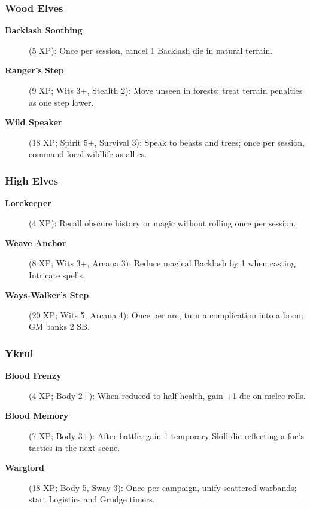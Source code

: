 \subsubsection{Wood Elves}\label{subsubsec:wood_elf_talents}

\begin{description}
    \item[\textbf{Backlash Soothing}] (5 XP): Once per session, cancel 1 Backlash die in natural terrain.
    \item[\textbf{Ranger's Step}] (9 XP; Wits 3+, Stealth 2): Move unseen in forests; treat terrain penalties as one step lower.
    \item[\textbf{Wild Speaker}] (18 XP; Spirit 5+, Survival 3): Speak to beasts and trees; once per session, command local wildlife as allies.
\end{description}

\subsubsection{High Elves}\label{subsubsec:high_elf_talents}

\begin{description}
    \item[\textbf{Lorekeeper}] (4 XP): Recall obscure history or magic without rolling once per session.
    \item[\textbf{Weave Anchor}] (8 XP; Wits 3+, Arcana 3): Reduce magical Backlash by 1 when casting Intricate spells.
    \item[\textbf{Ways‑Walker's Step}] (20 XP; Wits 5, Arcana 4): Once per arc, turn a complication into a boon; GM banks 2 SB.
\end{description}

\subsubsection{Ykrul}\label{subsubsec:ykrul_talents}

\begin{description}
    \item[\textbf{Blood Frenzy}] (4 XP; Body 2+): When reduced to half health, gain +1 die on melee rolls.
    \item[\textbf{Blood Memory}] (7 XP; Body 3+): After battle, gain 1 temporary Skill die reflecting a foe's tactics in the next scene.
    \item[\textbf{Warglord}] (18 XP; Body 5, Sway 3): Once per campaign, unify scattered warbands; start Logistics and Grudge timers.
\end{description}

